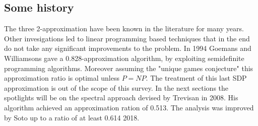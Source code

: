 \subsection{Some history}
The three 2-approximation have been known in the literature for many years.
Other invesigations led to linear programming based techniques that in the end do not take any significant improvements to the problem.
In 1994 Goemans and Williamsons gave a 0.828-approximation algorithm, by exploiting semidefinite programming algorithms. 
Moreover assuming the "unique games conjecture" this approximation ratio is optimal unless $P=NP$.
The treatment of this last SDP approximation is out of the scope of this survey. 
In the next sections the spotlights will be on the spectral approach devised by Trevisan in 2008.
His algorithm achieved an approximation ration of 0.513. The analysis was improved by Soto up to a ratio of at least 0.614 2018.